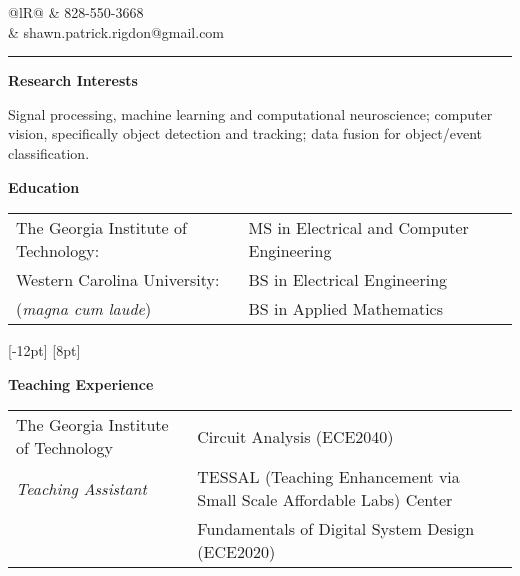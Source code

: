 \documentclass[10pt,letterpaper]{article}
\begin{document}
\pagestyle{empty}


\noindent
\begin{tabularx}{\linewidth}{@{}lR@{}}
 & \footnotesize{828-550-3668} \\[-4pt]
& \footnotesize{shawn.patrick.rigdon@gmail.com} \\[-4pt]
\end{tabularx}

\smallskip
\noindent\rule[\baselineskip]{\linewidth}{1.5pt}


\medskip
\noindent\textbf{\large{Research Interests}}

\medskip
\noindent\footnotesize{Signal processing, machine learning and computational neuroscience;
computer vision, specifically object detection and tracking;
data fusion for object/event classification.
}

\bigskip
\noindent\textbf{\large{Education}}

\medskip\noindent
\begin{tabular}{@{}ll@{}}
\footnotesize{The Georgia Institute of Technology:} & \footnotesize{MS in Electrical and Computer Engineering}\\[5pt]
\footnotesize{Western Carolina University:} & \footnotesize{BS in Electrical Engineering}\\
\footnotesize{(\textit{magna cum laude})} & \footnotesize{BS in Applied Mathematics}\\
\end{tabular}
[-12pt]
[8pt]

\bigskip
\noindent\textbf{\large{Teaching Experience}}

\medskip\noindent
\begin{tabular}{@{}ll@{}}
\footnotesize{The Georgia Institute of Technology} & \footnotesize{Circuit Analysis (ECE2040)}\\
\footnotesize{\textit{Teaching Assistant}} & \footnotesize{TESSAL (Teaching Enhancement via Small Scale Affordable Labs) Center}\\
& \footnotesize{Fundamentals of Digital System Design
(ECE2020)}\\
\end{tabular}
\end{document}

